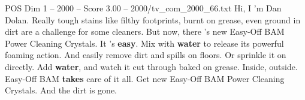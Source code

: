 \begin{textsample}{POS Dim 1 – 2000 – Score 3.00 – 2000/tv\_com\_2000\_66.txt}  \label{ex:f1_pos_078}
Hi, I 'm Dan Dolan.
Really tough stains like filthy footprints, burnt on grease, even ground in dirt are a challenge for some cleaners.
But now, there 's new Easy-Off BAM Power Cleaning Crystals.
It 's \textbf{easy}.
Mix with \textbf{water} to release its powerful foaming action.
And easily remove dirt and spills on floors.
Or sprinkle it on directly.
Add \textbf{water}, and watch it cut through baked on grease.
Inside, outside.
Easy-Off BAM \textbf{takes} care of it all.
Get new Easy-Off BAM Power Cleaning Crystals.
And the dirt is gone.

\end{textsample}
